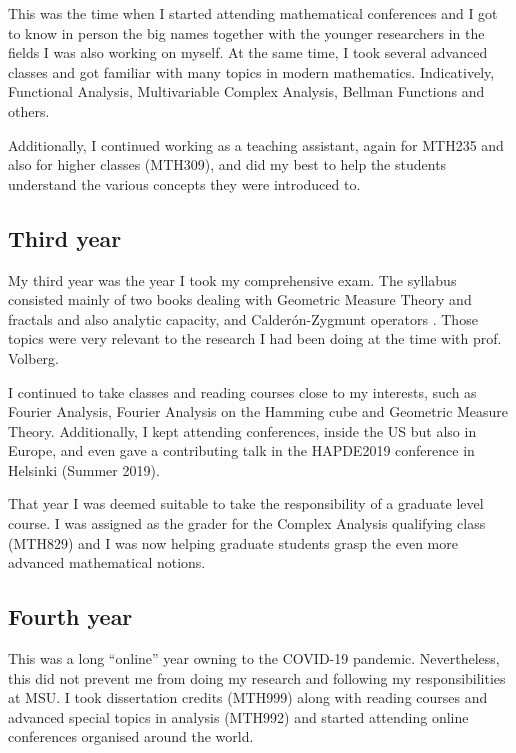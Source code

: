 \documentclass[11pt]{amsart} %
\begin{document}
This was the time when I started attending mathematical conferences and I got to know in person the big names together with the younger researchers in the fields I was also working on myself. At the same time, I took several advanced classes and got familiar with many topics in modern mathematics. Indicatively, Functional Analysis, Multivariable Complex Analysis, Bellman Functions and others.

Additionally, I continued working as a teaching assistant, again for MTH235 and also for higher classes (MTH309), and did my best to help the students understand the various concepts they were introduced to.


\subsection*{Third year} My third year was the year I took my comprehensive exam. The syllabus consisted mainly of two books dealing with Geometric Measure Theory and fractals \cite{Fal2003} and also analytic capacity, and Calder{\'o}n-Zygmunt operators \cite{Tol2014}. Those topics were very relevant to the research I had been doing at the time with prof. Volberg.

I continued to take classes and reading courses close to my interests, such as Fourier Analysis, Fourier Analysis on the Hamming cube and Geometric Measure Theory. Additionally, I kept attending conferences, inside the US but also in Europe, and even gave a contributing talk in the HAPDE2019 conference in Helsinki (Summer 2019).

That year I was deemed suitable to take the responsibility of a graduate level course. I was assigned as the grader for the Complex Analysis qualifying class (MTH829) and I was now helping graduate students grasp the even more advanced mathematical notions.


\subsection*{Fourth year} This was a long \enquote{online} year owning to the COVID-19 pandemic. Nevertheless, this did not prevent me from doing my research and following my responsibilities at MSU. I took dissertation credits (MTH999) along with reading courses and advanced special topics in analysis (MTH992) and started attending online conferences organised around the world.
\end{document}
